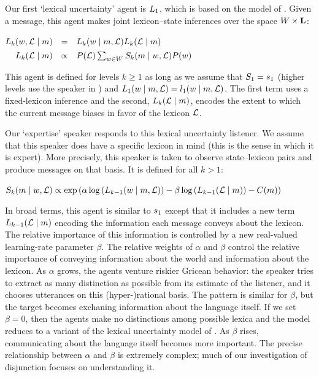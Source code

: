 \documentclass[12pt,twoside]{article}
\renewcommand{\_}{\textbf{\textunderscore\hspace{-4pt}\textunderscore\hspace{-3pt}\textunderscore\hspace{-4pt}\textunderscore}\hspace{0.5pt}}			%
\begin{document}
Our first `lexical uncertainty' agent is $\ListenerK[1]$, which is
based on the model of \citet{Smith:Goodman:Frank:2013}. Given a
message, this agent makes joint lexicon--state inferences over the
space $\States \times \LexSet$:
%
\begin{exe}
  \ex\label{L1}%
    \setlength{\arraycolsep}{2pt}%
    $\begin{array}[t]{@{} r c l}
      \ListenerK(\state, \Lex \given \msg) 
      &=&
      \ListenerK(\state \given \msg, \Lex) \ListenerK(\Lex \given \msg) 
      \\[1ex]
      \ListenerK(\Lex \given \msg) 
      &\propto& 
      \Prior(\Lex) \sum_{\state\in\States} \SpeakerK(\msg \given \state, \Lex)\Prior(\state)
    \end{array}$
\end{exe}
%
This agent is defined for levels $k \geqslant 1$ as long as we assume
that $\SpeakerK[1] = \speakerOne$ (higher levels use the speaker in
) and
$\ListenerK[1](\state \given \msg, \Lex) = \listenerOne(\state \given \msg, \Lex)$.
The first term uses a fixed-lexicon inference and the second,
$\ListenerK(\Lex \given \msg)$, encodes the extent to which the
current message biases in favor of the lexicon $\Lex$.

Our `expertise' speaker responds to this lexical uncertainty listener.
We assume that this speaker does have a specific lexicon in mind (this
is the sense in which it is expert).  More precisely, this speaker is
taken to observe state--lexicon pairs and produce messages on that
basis. It is defined for all $k > 1$:

\begin{exe}  
  \ex\label{Sk}%
   $\SpeakerK(\msg \given \state, \Lex) \propto \exponential \left( \alpha\log\left(\ListenerK[k-1](\state \given \msg, \Lex)\right)  -  \beta\log\left(\ListenerK[k-1](\Lex\given\msg)\right) - \Costs(\msg) \right)$
\end{exe}
%
In broad terms, this agent is similar to $\speakerOne$ except that it
includes a new term $\ListenerK[k-1](\Lex\given\msg)$ encoding the
information each message conveys about the lexicon. The relative
importance of this information is controlled by a new real-valued
learning-rate parameter $\beta$. The relative weights of $\alpha$ and
$\beta$ control the relative importance of conveying information about
the world and information about the lexicon. As $\alpha$ grows, the
agents venture riskier Gricean behavior: the speaker tries to extract
as many distinction as possible from its estimate of the listener, and
it chooses utterances on this (hyper-)rational basis. The pattern is
similar for $\beta$, but the target becomes exchaning information
about the language itself. If we set $\beta=0$, then the agents make
no distinctions among possible lexica and the model reduces to a
variant of the lexical uncertainty model of
\citet{Bergen:Levy:Goodman:2014}. As $\beta$ rises, communicating
about the language itself becomes more important. The precise
relationship between $\alpha$ and $\beta$ is extremely complex; much
of our investigation of disjunction focuses on understanding it.
\end{document}
